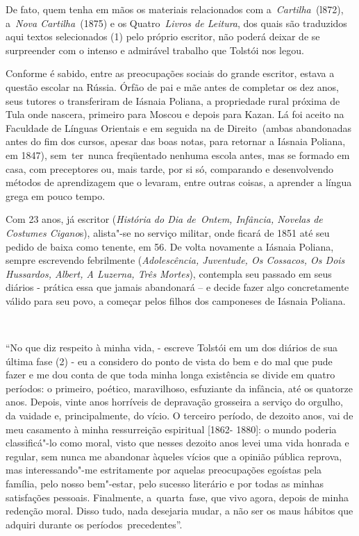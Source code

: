 De fato, quem tenha em mãos os materiais relacionados com
a~\emph{Cartilha~}(l872), a~\emph{Nova Cartilha~}(1875) e os
Quatro~\emph{Livros de Leitura}, dos quais são traduzidos aqui textos
selecionados (1) pelo próprio escritor, não poderá deixar de se
surpreender com o intenso e admirável trabalho que Tolstói nos legou.

Conforme é sabido, entre as preocupações sociais do grande escritor,
estava a questão escolar na Rússia. Órfão de pai e mãe antes de
completar os dez anos, seus tutores o transferiram de Iásnaia Poliana, a
propriedade rural próxima de Tula onde nascera, primeiro para Moscou e
depois para Kazan. Lá foi aceito na Faculdade de Línguas Orientais e em
seguida na de Direito\textbf{~}(ambas abandonadas antes do fim dos
cursos, apesar das boas notas, para retornar a Iásnaia Poliana, em
1847), sem~ter~nunca freqüentado nenhuma escola antes, mas se formado em
casa, com preceptores ou, mais tarde, por si só, comparando e
desenvolvendo métodos de aprendizagem que o levaram, entre outras
coisas, a aprender a língua grega em pouco tempo.

Com 23 anos, já escritor (\emph{História do Dia de~Ontem, Infância,
Novelas de Costumes Cigano}s), alista"-se no serviço militar, onde ficará
de 1851 até seu pedido de baixa como tenente, em 56. De volta novamente
a Iásnaia Poliana, sempre escrevendo febrilmente (\emph{Adolescência,
Juventude, Os Cossacos, Os Dois Hussardos, Albert, A Luzerna, Três
Mortes}), contempla seu passado em seus diários - prática essa que
jamais abandonará -- e decide fazer algo concretamente válido para seu
povo, a começar pelos filhos dos camponeses de Iásnaia Poliana.~

~

``No que diz respeito à minha vida, - escreve Tolstói em um dos diários
de sua última fase (2) - eu a considero do ponto de vista do bem e do
mal que pude fazer e me dou conta de que toda minha longa existência se
divide em quatro períodos: o primeiro, poético, maravilhoso, esfuziante
da infância, até os quatorze anos. Depois, vinte anos horríveis de
depravação grosseira a serviço do orgulho, da vaidade e, principalmente,
do vício. O terceiro período, de dezoito anos, vai de meu casamento à
minha ressurreição espiritual {[}1862- 1880{]}: o mundo poderia
classificá"-lo como moral, visto que nesses dezoito anos levei uma vida
honrada e regular, sem nunca me abandonar àqueles vícios que a opinião
pública reprova, mas interessando"-me estritamente por aquelas
preocupações egoístas pela família, pelo nosso bem"-estar, pelo sucesso
literário e por todas as minhas satisfações pessoais. Finalmente,
a~quarta~fase, que vivo agora, depois de minha redenção moral. Disso
tudo, nada desejaria mudar, a não ser os maus hábitos que adquiri
durante os períodos~precedentes''.

